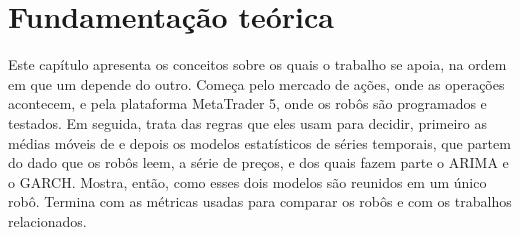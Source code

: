 %
%
%
%
\chapter{Fundamentação teórica}

Este capítulo apresenta os conceitos sobre os quais o trabalho se apoia, na ordem
em que um depende do outro. Começa pelo mercado de ações, onde as operações
acontecem, e pela plataforma MetaTrader 5, onde os robôs são programados e
testados. Em seguida, trata das regras que eles usam para decidir, primeiro as
médias móveis de  e depois os modelos estatísticos de
séries temporais, que partem do dado que os robôs leem, a série de preços, e dos
quais fazem parte o ARIMA e o GARCH. Mostra, então, como esses dois modelos são
reunidos em um único robô. Termina com as
métricas usadas para comparar os robôs e com os trabalhos relacionados.

